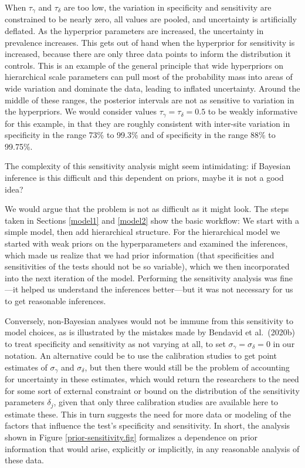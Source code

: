 \documentclass[11pt]{article}
\begin{document}
When $\tau_{\gamma}$ and $\tau_{\delta}$ are too low, the variation in
specificity and sensitivity are constrained to be nearly zero, all
values are pooled, and uncertainty is artificially deflated. As the
hyperprior parameters are increased, the uncertainty in prevalence
increases. This gets out of hand when the hyperprior for sensitivity
is increased, because there are only three data points to inform the
distribution it controls. This is an example of the general principle
that wide hyperpriors on hierarchical scale parameters can pull most
of the probability mass into areas of wide variation and dominate the
data, leading to inflated uncertainty.  Around the middle of these
ranges, the posterior intervals are not as sensitive to variation in
the hyperpriors. We would consider values
$\tau_{\gamma}=\tau_{\delta}=0.5$ to be weakly informative for this
example, in that they are roughly consistent with inter-site variation
in specificity in the range 73\% to 99.3\% and of specificity in the
range 88\% to 99.75\%.

The complexity of this sensitivity analysis might seem intimidating:
if Bayesian inference is this difficult and this dependent on priors,
maybe it is not a good idea?

We would argue that the problem is not as difficult as it might look.
The steps taken in Sections \ref{model1} and \ref{model2} show the
basic workflow: We start with a simple model, then add hierarchical
structure.  For the hierarchical model we started with weak priors on
the hyperparameters and examined the inferences, which made us realize
that we had prior information (that specificities and sensitivities of
the tests should not be so variable), which we then incorporated into
the next iteration of the model.  Performing the sensitivity analysis
was fine---it helped us understand the inferences better---but it was
not necessary for us to get reasonable inferences.

Conversely, non-Bayesian analyses would not be immune from this
sensitivity to model choices, as is illustrated by the mistakes made
by Bendavid et al.\ (2020b) to treat specificity and sensitivity as
not varying at all, to set $\sigma_{\gamma}=\sigma_{\delta}=0$ in our
notation.  An alternative could be to use the calibration studies to
get point estimates of $\sigma_{\gamma}$ and $\sigma_{\delta}$, but
then there would still be the problem of accounting for uncertainty in
these estimates, which would return the researchers to the need for
some sort of external constraint or bound on the distribution of the
sensitivity parameters $\delta_j$, given that only three calibration
studies are available here to estimate these.  This in turn suggests
the need for more data or modeling of the factors that influence the
test's specificity and sensitivity.  In short, the analysis shown in
Figure \ref{prior-sensitivity.fig} formalizes a dependence on prior
information that would arise, explicitly or implicitly, in any
reasonable analysis of these data.
\end{document}
